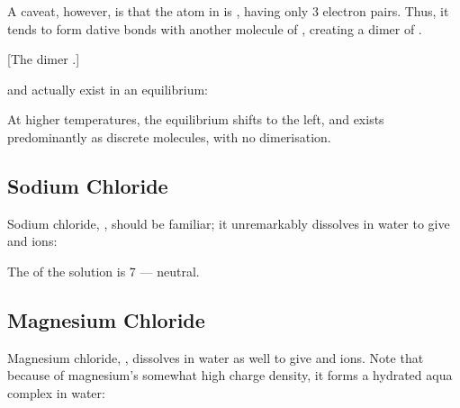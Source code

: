 				A caveat, however, is that the \ch{\Al} atom in  is , having only 3 electron pairs. Thus,
				it tends to form dative bonds with another molecule of , creating a dimer of .


				[The dimer .]

				\pagebreak
				 and  actually exist in an equilibrium:


				At higher temperatures, the equilibrium shifts to the left, and  exists predominantly as discrete molecules, with
				no dimerisation.



		\subsection{Sodium Chloride}

			Sodium chloride, , should be familiar; it unremarkably dissolves in water to give  and
			\ch{\Cl- \stAq} ions:


			The \pH{} of the solution is \num{7} --- neutral.




		\subsection{Magnesium Chloride}

			Magnesium chloride, , dissolves in water as well to give  and \ch{\Cl- \stAq} ions. Note that because
			of magnesium's somewhat high charge density, it forms a hydrated aqua complex in water:


